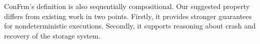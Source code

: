 ConFrm's definition is also sequentially compositional. Our suggested property differs from existing work in two points. Firstly, it provides stronger guarantees for nondeterministic executions. Secondly, it supports reasoning about crash and recovery of the storage system.

	
	
	
	
